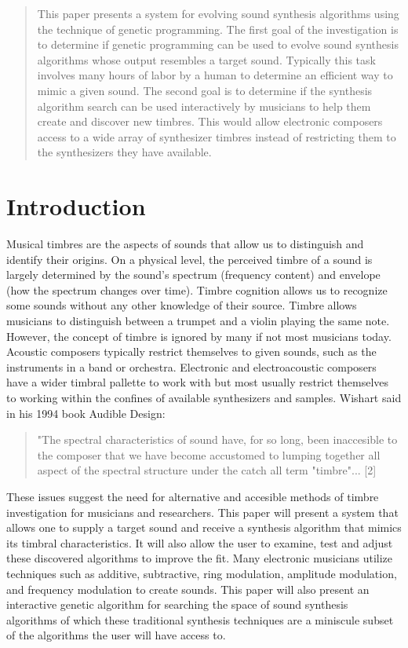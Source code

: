 \documentclass[12pt]{article}
\begin{document}
\maketitle

\begin{abstract}
This paper presents a system for evolving sound synthesis algorithms using the technique of genetic programming. The first goal of the investigation is to determine if genetic programming can be used to evolve sound synthesis algorithms whose output resembles a target sound. Typically this task involves many hours of labor by a human to determine an efficient way to mimic a given sound. The second goal is to determine if the synthesis algorithm search can be used interactively by musicians to help them create and discover new timbres. This would allow electronic composers access to a wide array of synthesizer timbres instead of restricting them to the synthesizers they have available.
\end{abstract}

\section{Introduction}
Musical timbres are the aspects of sounds that allow us to distinguish and identify their origins. On a physical level, the perceived timbre of a sound is largely determined by the sound's spectrum (frequency content) and envelope (how the spectrum changes over time). Timbre cognition allows us to recognize some sounds without any other knowledge of their source. Timbre allows musicians to distinguish between a trumpet and a violin playing the same note. However, the concept of timbre is ignored by many if not most musicians today. Acoustic composers typically restrict themselves to given sounds, such as the instruments in a band or orchestra. Electronic and electroacoustic composers have a wider timbral pallette to work with but most usually restrict themselves to working within the confines of available synthesizers and samples. Wishart said in his 1994 book Audible Design:
\begin{quote}
"The spectral characteristics of sound have, for so long, been inaccesible to the composer that we have become accustomed to lumping together all aspect of the spectral structure under the catch all term "timbre"... [2]
\end{quote}	 
These issues suggest the need for alternative and accesible methods of timbre investigation for musicians and researchers. This paper will present a system that allows one to supply a target sound and receive a synthesis algorithm that mimics its timbral characteristics. It will also allow the user to examine, test and adjust these discovered algorithms to improve the fit. Many electronic musicians utilize techniques such as additive, subtractive, ring modulation, amplitude modulation, and frequency modulation to create sounds. This paper will also present an interactive genetic algorithm for searching the space of sound synthesis algorithms of which these traditional synthesis techniques are a miniscule subset of the algorithms the user will have access to.
\end{document}
